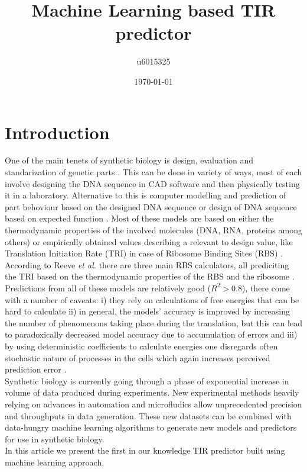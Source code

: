 \documentclass{article}
\title{Machine Learning based TIR predictor}
\author{u6015325 }
\date{\today{}}
\begin{document}
\maketitle

\section{Introduction}

One of the main tenets of synthetic biology is design, evaluation and standarization of genetic parts \cite{Brophy2014,Canton2008,Stanton2014}. This can be done in variety of ways, most of each involve designing the DNA sequence in CAD software and then physically testing it in a laboratory. Alternative to this is computer modelling and prediction of part behoviour based on the designed DNA sequence or design of DNA sequence based on expected function \cite{Yeoh2019,Nielsen2016}. Most of these models are based on either the thermodynamic properties of the involved molecules (DNA, RNA, proteins among others) or empirically obtained values describing a relevant to design value, like Translation Initiation Rate (TRI) in case of Ribosome Binding Sites (RBS) \cite{Xia1998,Chen1994,Vellanoweth1992,Chen2013,Reeve2014}.\\
According to Reeve \emph{et al.} there are three main RBS calculators, all prediciting the TRI based on the thermodynamic properties of the RBS and the ribosome \cite{Seo2013,Na2010,Salis2009}. Predictions from all of these models are relatively good ($R^2 >0.8$), there come with a number of caveats: i) they rely on calculations of free energies that can be hard to calculate ii) in general, the models' accuracy is improved by increasing the number of phenomenons taking place during the translation, but this can lead to paradoxically decreased model accuracy due to accumulation of errors \cite{EspahBorujeni2016} and iii) by using deterministic coefficients to calculate energies one disregards often stochastic nature of processes in the cells which again increases perceived prediction error \cite{Goss1998}. \\
Synthetic biology is currently going through a phase of exponential increase in volume of data produced during experiments. \cite{Freemont2019} New experimental methods heavily relying on advances in automation and microfludics allow unprecedented precision and throughputs in data generation. These new datasets can be combined with data-hungry machine learning algorithms to generate new models and predictors for use in synthetic biology.  \\
In this article we present the first in our knowledge TIR predictor built using machine learning approach.
\end{document}
